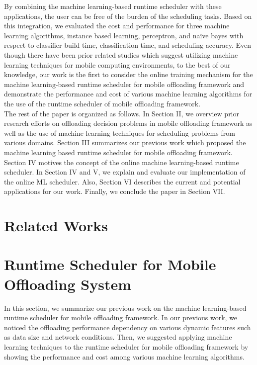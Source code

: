 \documentclass[10pt, conference, compsocconf]{IEEEtran}
\begin{document}
%
By combining the machine learning-based runtime scheduler with these
applications, the user can be free of the burden of the scheduling
tasks.
%
Based on this integration, we evaluated the cost and performance for
three machine learning algorithms, instance based learning, perceptron,
and na\"{i}ve bayes with respect to classifier build time,
classification time, and scheduling accuracy.
%
Even though there have been prior related studies which suggest
utilizing machine learning techniques for mobile computing environments,
to the best of our knowledge, our work is the first to consider the
online training mechanism for the machine learning-based runtime
scheduler for mobile offloading framework and demonstrate the
performance and cost of various machine learning algorithms for the use
of the runtime scheduler of mobile offloading framework.\\   
%
\indent The rest of the paper is organized  as follows.
%
In Section II, we overview prior research efforts on offloading decision
problems in mobile offloading framework as well as the use of machine
learning techniques for scheduling problems from various domains.
%
Section III summarizes our previous work which proposed the machine
learning based runtime scheduler for mobile offloading framework.
%
Section IV motives the concept of the online machine learning-based
runtime scheduler.
%
In Section IV and V, we explain and evaluate our implementation of the
online ML scheduler.
%
Also, Section VI describes the current and potential applications for
our work.
%
Finally, we conclude the paper in Section VII.
%
\section{Related Works}
%
\section{Runtime Scheduler for Mobile Offloading System}
%
In this section, we summarize our previous work on the machine
learning-based runtime scheduler for mobile offloading framework.
%
In our previous work, we noticed the offloading performance dependency on
various dynamic features such as data size and network conditions.
%
Then, we suggested applying machine learning techniques to the runtime
scheduler for mobile offloading framework by showing the performance and
cost among various machine learning algorithms. 
% 
\end{document}
